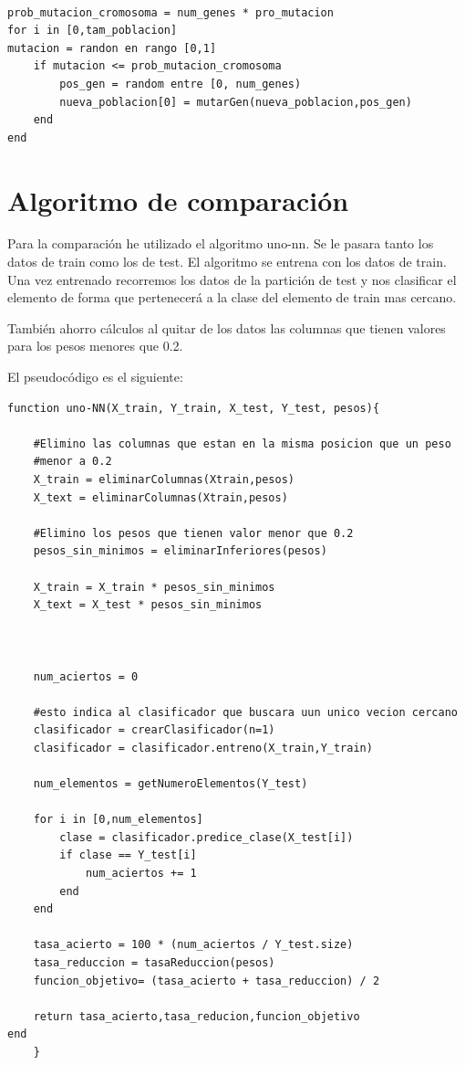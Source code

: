 \documentclass[titlepage]{article}
\begin{document}
	\begin{lstlisting}

prob_mutacion_cromosoma = num_genes * pro_mutacion	
for i in [0,tam_poblacion]
mutacion = randon en rango [0,1]
	if mutacion <= prob_mutacion_cromosoma	
		pos_gen = random entre [0, num_genes)
		nueva_poblacion[0] = mutarGen(nueva_poblacion,pos_gen)
	end	
end
	\end{lstlisting}
	
	
	
	\section{Algoritmo de comparación}

	
	Para la comparación he utilizado el algoritmo uno-nn. Se le pasara tanto los datos de train como los de test. El algoritmo se entrena con los datos de train. Una vez entrenado recorremos los datos de la partición de test y nos clasificar el elemento de forma que pertenecerá a la clase del elemento de train mas cercano.
	
	
	También ahorro cálculos al quitar de los datos las columnas que tienen valores para los pesos menores que 0.2. 
	
	El pseudocódigo es el siguiente:

	
	\begin{lstlisting}
function uno-NN(X_train, Y_train, X_test, Y_test, pesos){
	
	#Elimino las columnas que estan en la misma posicion que un peso 
	#menor a 0.2
	X_train = eliminarColumnas(Xtrain,pesos)
	X_text = eliminarColumnas(Xtrain,pesos)
	
	#Elimino los pesos que tienen valor menor que 0.2
	pesos_sin_minimos = eliminarInferiores(pesos)
	
	X_train = X_train * pesos_sin_minimos
	X_text = X_test * pesos_sin_minimos
	
	
	
	num_aciertos = 0
	
	#esto indica al clasificador que buscara uun unico vecion cercano
	clasificador = crearClasificador(n=1)
	clasificador = clasificador.entreno(X_train,Y_train)
	
	num_elementos = getNumeroElementos(Y_test)
	
	for i in [0,num_elementos]
		clase = clasificador.predice_clase(X_test[i])
		if clase == Y_test[i]
			num_aciertos += 1
		end
	end
	
	tasa_acierto = 100 * (num_aciertos / Y_test.size)
	tasa_reduccion = tasaReduccion(pesos)
	funcion_objetivo= (tasa_acierto + tasa_reduccion) / 2
	
	return tasa_acierto,tasa_reducion,funcion_objetivo
end
	}
	\end{lstlisting}
	
\end{document}
